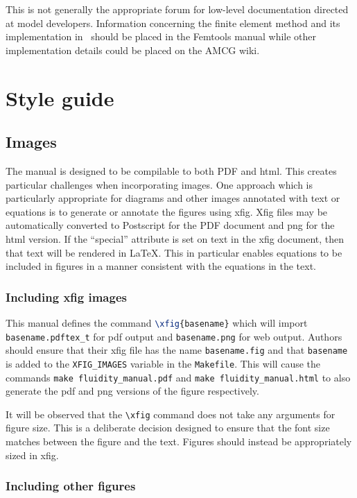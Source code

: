 This is not generally the appropriate forum for low-level documentation
directed at model developers. Information concerning the finite element
method and its implementation in \fluidity\ should be placed in the Femtools
manual while other implementation details could be placed on the AMCG wiki.

\section{Style guide}

\subsection{Images}

The manual is designed to be compilable to both PDF and html. This creates
particular challenges when incorporating images. One approach which is
particularly appropriate for diagrams and other images annotated with text
or equations is to generate or annotate the figures using xfig. Xfig files
may be automatically converted to Postscript for the PDF document and png
for the html version. If the ``special'' attribute is set on text in the
xfig document, then that text will be rendered in \LaTeX. This in particular
enables equations to be included in figures in a manner consistent with the
equations in the text.

\subsubsection{Including xfig images}

This manual defines the command \lstinline[language=TeX]+\xfig{basename}+
which will import \verb+basename.pdftex_t+ for pdf output and
\verb+basename.png+ for web output. Authors should ensure that their xfig
file has the name \verb+basename.fig+ and that \verb+basename+ is added to
the \verb+XFIG_IMAGES+ variable in the \verb+Makefile+. This will cause the
commands \verb+make fluidity_manual.pdf+ and
\verb+make fluidity_manual.html+ to also generate the pdf and png versions
of the figure respectively.

It will be observed that the \verb+\xfig+ command does not take any arguments
for figure size. This is a deliberate decision designed to ensure that the
font size matches between the figure and the text. Figures should instead be
appropriately sized in xfig.

\subsubsection{Including other figures}

